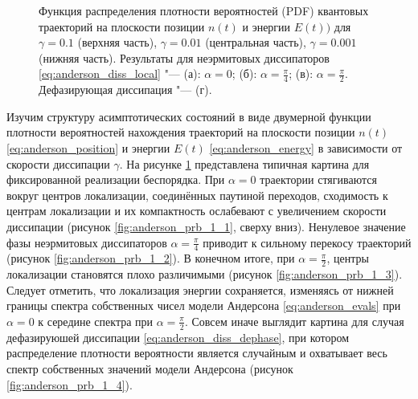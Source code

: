 \begin{figure}[ht]
	\legend{}
	\caption[Плотность вероятностей квантовых траекторий на плоскости позиции и энергий в зависимости от параметров и скорости неэрмитовой диссипации]
	{
		Функция распределения плотности вероятностей (PDF) квантовых траекторий на плоскости позиции \(n(t)\) и энергии \(E(t))\) для \(\gamma=0.1\) (верхняя часть),  \(\gamma=0.01\) (центральная часть),  \(\gamma=0.001\) (нижняя часть). Результаты для неэрмитовых диссипаторов \cref{eq:anderson_diss_local} "--- (а): \(\alpha=0\); (б): \(\alpha=\frac{\pi}{4}\); (в): \(\alpha=\frac{\pi}{2}\). Дефазирующая диссипация "--- (г).
	}
	\label{fig:anderson_prb_1}
\end{figure}

Изучим структуру асимптотических состояний в виде двумерной функции плотности вероятностей нахождения траекторий на плоскости позиции \(n(t)\) \cref{eq:anderson_position} и энергии \(E(t)\) \cref{eq:anderson_energy} в зависимости от скорости диссипации \(\gamma\). На рисунке \cref{fig:anderson_prb_1} представлена типичная картина для фиксированной реализации беспорядка. При \(\alpha=0\) траектории стягиваются вокруг центров локализации, соединённых паутиной переходов, сходимость к центрам локализации и их компактность ослабевают с увеличением скорости диссипации (рисунок \cref{fig:anderson_prb_1_1}, сверху вниз).
Ненулевое значение фазы неэрмитовых диссипаторов \(\alpha=\frac{\pi}{4}\) приводит к сильному перекосу траекторий (рисунок \cref{fig:anderson_prb_1_2}). В конечном итоге, при \(\alpha=\frac{\pi}{2}\), центры локализации становятся плохо различимыми (рисунок \cref{fig:anderson_prb_1_3}). Следует отметить, что локализация энергии сохраняется, изменяясь от нижней границы спектра собственных чисел модели Андерсона \cref{eq:anderson_evals} при \(\alpha=0\) к середине спектра при \(\alpha=\frac{\pi}{2}\). Совсем иначе выглядит картина для случая дефазируюшей диссипации \cref{eq:anderson_diss_dephase}, при котором распределение плотности вероятности является случайным и охватывает весь спектр собственных значений модели Андерсона (рисунок \cref{fig:anderson_prb_1_4}).

